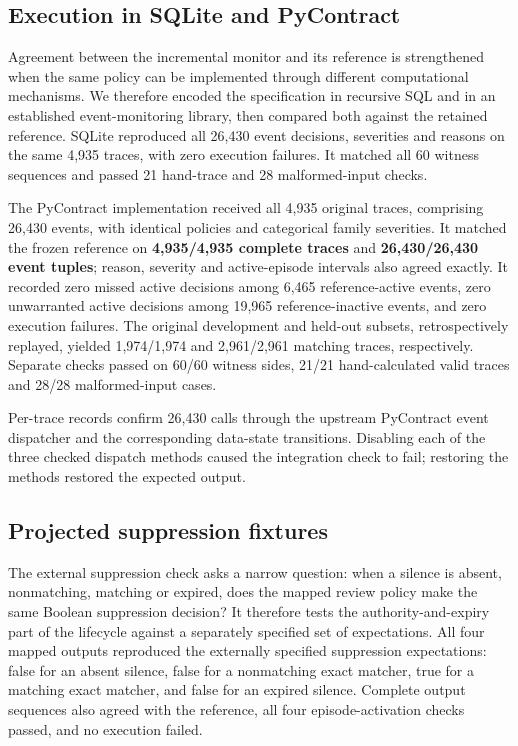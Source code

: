 \documentclass[preprint,11pt]{elsarticle}
\begin{document}
\subsection{Execution in SQLite and PyContract}
Agreement between the incremental monitor and its reference is strengthened when the same policy can be implemented through different computational mechanisms. We therefore encoded the specification in recursive SQL and in an established event-monitoring library, then compared both against the retained reference. SQLite reproduced all 26,430 event decisions, severities and reasons on the same 4,935 traces, with zero execution failures. It matched all 60 witness sequences and passed 21 hand-trace and 28 malformed-input checks.

The PyContract implementation received all 4,935 original traces, comprising 26,430 events, with identical policies and categorical family severities. It matched the frozen reference on \textbf{4,935/4,935 complete traces} and \textbf{26,430/26,430 event tuples}; reason, severity and active-episode intervals also agreed exactly. It recorded zero missed active decisions among 6,465 reference-active events, zero unwarranted active decisions among 19,965 reference-inactive events, and zero execution failures. The original development and held-out subsets, retrospectively replayed, yielded 1,974/1,974 and 2,961/2,961 matching traces, respectively. Separate checks passed on 60/60 witness sides, 21/21 hand-calculated valid traces and 28/28 malformed-input cases.

Per-trace records confirm 26,430 calls through the upstream PyContract event dispatcher and the corresponding data-state transitions. Disabling each of the three checked dispatch methods caused the integration check to fail; restoring the methods restored the expected output.

\subsection{Projected suppression fixtures}
The external suppression check asks a narrow question: when a silence is absent, nonmatching, matching or expired, does the mapped review policy make the same Boolean suppression decision? It therefore tests the authority-and-expiry part of the lifecycle against a separately specified set of expectations. All four mapped outputs reproduced the externally specified suppression expectations: false for an absent silence, false for a nonmatching exact matcher, true for a matching exact matcher, and false for an expired silence. Complete output sequences also agreed with the reference, all four episode-activation checks passed, and no execution failed.
\end{document}
